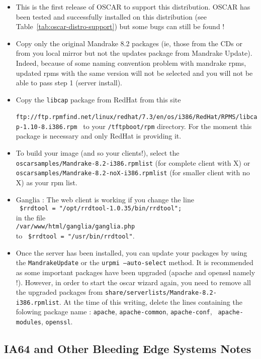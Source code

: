 \begin{itemize}
\item This is the first release of OSCAR to support this distribution. OSCAR
  \oscarversion\- has been tested and successfully installed 
  on this distribution (see Table~\ref{tab:oscar-distro-support}) but some
  bugs can still be found !
\item Copy only the original Mandrake 8.2 packages (ie, those from the CDs or
from you local mirror but not the updates package from Mandrake Update).
Indeed, because of some naming convention problem with mandrake rpms, updated rpms with the
same version will not be selected and you will not be able to pass step 1
(server install).
\item Copy the {\tt libcap} package from RedHat from this site\\
{\tiny{ \tt
ftp://ftp.rpmfind.net/linux/redhat/7.3/en/os/i386/RedHat/RPMS/libcap-1.10-8.i386.rpm
}}
to your {\tt /tftpboot/rpm} directory. For the moment this package is
necessary and only RedHat is providing it.
\item To build your image (and so your clients!), select the {\tt
oscarsamples/Mandrake-8.2-i386.rpmlist} (for complete client with X) or
{\tt oscarsamples/Mandrake-8.2-noX-i386.rpmlist} (for smaller client with no
X) as your rpm list.
\item Ganglia : The web client is working if you change the line \\
\verb+ $rrdtool = "/opt/rrdtool-1.0.35/bin/rrdtool";+ \\
in the file \\
{\tt /var/www/html/ganglia/ganglia.php}\\ to 
\verb+ $rrdtool = "/usr/bin/rrdtool"+.
\item Once the server has been installed, you can update your packages by
using the {\tt MandrakeUpdate} or the {\tt urpmi --auto-select} method. It is
recommended as some important packages have been upgraded (apache and openssl
namely !). 
However, in order to start the oscar wizard again, you need to remove all the 
upgraded packages from {\tt share/serverlists/Mandrake-8.2-i386.rpmlist}. 
At the time of this writing, delete the lines containing the folowing package
name : {\tt  apache}, {\tt apache-common}, {\tt apache-conf}, {\tt
apache-modules}, {\tt openssl}.
\end{itemize}


\subsection{IA64 and Other Bleeding Edge Systems Notes}
\label{subsec:ia64notes}

